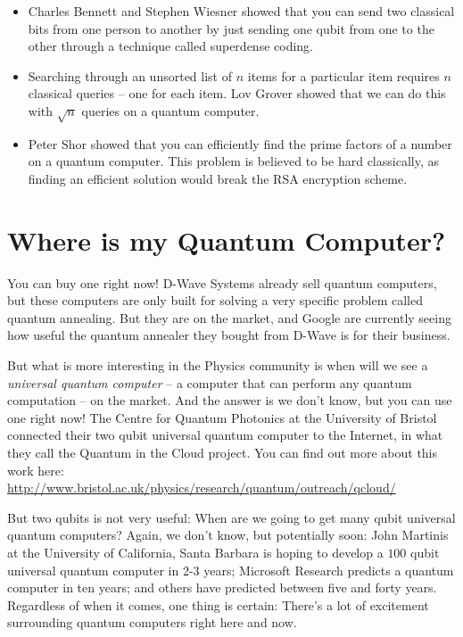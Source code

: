 \documentclass[twocolumn]{article}
\begin{document}
\begin{itemize}
\item Charles Bennett and Stephen Wiesner showed that you can send two classical bits from one person to another by just sending one qubit from one to the other through a technique called superdense coding.
\item Searching through an unsorted list of $n$ items for a particular item requires $n$ classical queries -- one for each item. Lov Grover showed that we can do this with $\sqrt{n}$ queries on a quantum computer.
\item Peter Shor showed that you can efficiently find the prime factors of a number on a quantum computer. This problem is believed to be hard classically, as finding an efficient solution would break the RSA encryption scheme.
\end{itemize}

\section{Where is my Quantum Computer?}

You can buy one right now! D-Wave Systems already sell quantum computers, but these computers are only built for solving a very specific problem called quantum annealing. But they are on the market, and Google are currently seeing how useful the quantum annealer they bought from D-Wave is for their business.

But what is more interesting in the Physics community is when will we see a {\em universal quantum computer} -- a computer that can perform any quantum computation -- on the market. And the answer is we don't know, but you can use one right now! The Centre for Quantum Photonics at the University of Bristol connected their two qubit universal quantum computer to the Internet, in what they call the Quantum in the Cloud project. You can find out more about this work here: \url{http://www.bristol.ac.uk/physics/research/quantum/outreach/qcloud/}

But two qubits is not very useful: When are we going to get many qubit universal quantum computers? Again, we don't know, but potentially soon: John Martinis at the University of California, Santa Barbara is hoping to develop a $100$ qubit universal quantum computer in 2-3 years; Microsoft Research predicts a quantum computer in ten years; and others have predicted between five and forty years. Regardless of when it comes, one thing is certain: There's a lot of excitement surrounding quantum computers right here and now.
\end{document}

